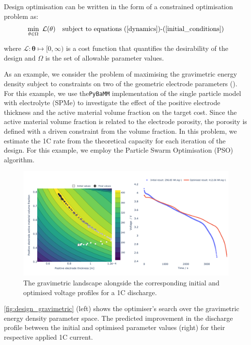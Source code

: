 \documentclass[
]{article}
\begin{document}
Design optimisation can be written in the form of a constrained
optimisation problem as: \begin{equation}
\min_{\mathbf{\theta} \in \Omega} ~ \mathcal{L}(\mathbf{\theta}) ~~~
\textrm{subject to equations (\ref{dynamics})\textrm{-}(\ref{initial_conditions})}
\label{eqn:design}
\end{equation}

where \(\mathcal{L} : \mathbf{\theta} \mapsto [0,\infty)\) is a cost
function that quantifies the desirability of the design and \(\Omega\)
is the set of allowable parameter values.

As an example, we consider the problem of maximising the gravimetric
energy density subject to constraints on two of the geometric electrode
parameters (). For this
example, we use the\texttt{PyBaMM} implementation of the single particle
model with electrolyte (SPMe) to investigate the effect of the positive
electrode thickness and the active material volume fraction on the
target cost. Since the active material volume fraction is related to the
electrode porosity, the porosity is defined with a driven constraint
from the volume fraction. In this problem, we estimate the 1C rate from
the theoretical capacity for each iteration of the design. For this
example, we employ the Particle Swarm Optimisation (PSO) algorithm.

\begin{figure}
\centering
\includegraphics[width=1\textwidth,height=\textheight]{figures/joss/design.png}
\caption{The gravimetric landscape alongside the corresponding initial
and optimised voltage profiles for a 1C discharge.
\label{fig:design_gravimetric}}
\end{figure}

\autoref{fig:design_gravimetric} (left) shows the optimiser's search
over the gravimetric energy density parameter space. The predicted
improvement in the discharge profile between the initial and optimised
parameter values (right) for their respective applied 1C current.
\end{document}
